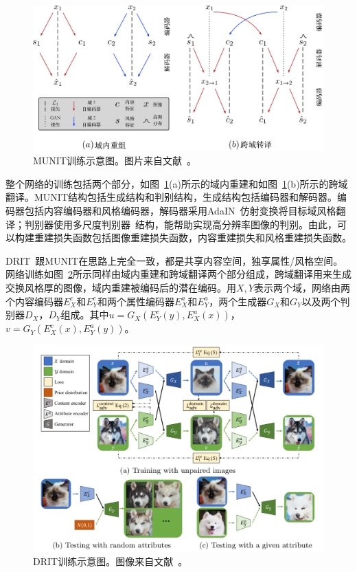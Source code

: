 \begin{figure}[ht]
    \centering
	\includegraphics[width=\textwidth]{figures/munit.pdf}
	\caption{MUNIT训练示意图。图片来自文献~\cite{huang2018multimodal}。}
	\label{fig:munit}
\end{figure}

整个网络的训练包括两个部分，如图~\ref{fig:munit}(a)所示的域内重建和如图~\ref{fig:munit}(b)所示的跨域翻译。MUNIT结构包括生成结构和判别结构，生成结构包括编码器和解码器。编码器包括内容编码器和风格编码器，解码器采用AdaIN~\cite{huang2017arbitrary}仿射变换将目标域风格翻译；判别器使用多尺度判别器~\cite{wang2018high}结构，能帮助实现高分辨率图像的判别。由此，可以构建重建损失函数包括图像重建损失函数，内容重建损失和风格重建损失函数。

DRIT~\cite{lee2018diverse}跟MUNIT在思路上完全一致，都是共享内容空间，独享属性/风格空间。网络训练如图~\ref{fig:drit}所示同样由域内重建和跨域翻译两个部分组成，跨域翻译用来生成交换风格厚的图像，域内重建被编码后的潜在编码。用$X, Y$表示两个域，网络由两个内容编码器$E_{X}^{c}$和$E_{Y}^{c}$和两个属性编码器$E_{X}^{a}$和$E_{Y}^{a}$，两个生成器$G_X$和$G_Y$以及两个判别器$D_X$，$D_Y$组成。其中$u=G_X(E_Y^c(y),E_X^a(x))$，$v=G_Y(E_X^c(x),E_Y^a(y))$。

\begin{figure}[ht]
    \centering
	\includegraphics[width=\textwidth]{figures/DRIT.pdf}
	\caption{DRIT训练示意图。图像来自文献~\cite{lee2018diverse}。}
	\label{fig:drit}
\end{figure}

